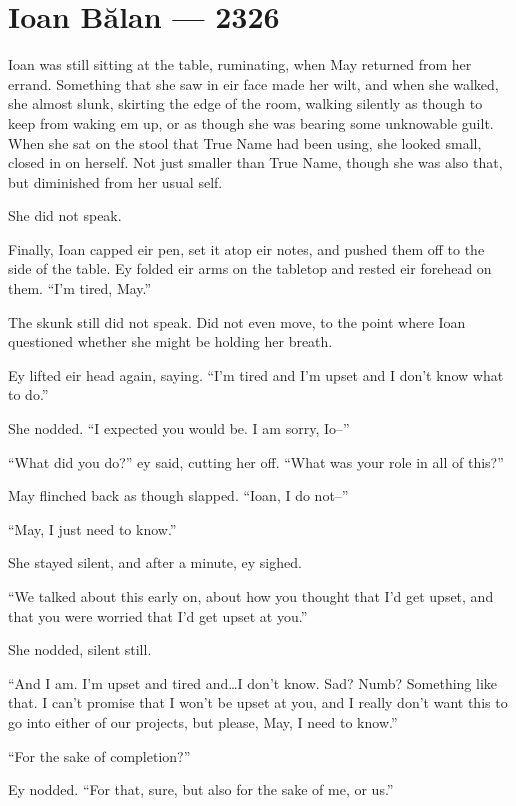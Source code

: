 \hypertarget{ioan-bux103lan-2326}{%
\chapter{Ioan Bălan — 2326}\label{ioan-bux103lan-2326}}

Ioan was still sitting at the table, ruminating, when May returned from her errand. Something that she saw in eir face made her wilt, and when she walked, she almost slunk, skirting the edge of the room, walking silently as though to keep from waking em up, or as though she was bearing some unknowable guilt. When she sat on the stool that True Name had been using, she looked small, closed in on herself. Not just smaller than True Name, though she was also that, but diminished from her usual self.

She did not speak.

Finally, Ioan capped eir pen, set it atop eir notes, and pushed them off to the side of the table. Ey folded eir arms on the tabletop and rested eir forehead on them. ``I'm tired, May.''

The skunk still did not speak. Did not even move, to the point where Ioan questioned whether she might be holding her breath.

Ey lifted eir head again, saying. ``I'm tired and I'm upset and I don't know what to do.''

She nodded. ``I expected you would be. I am sorry, Io--''

``What did you do?'' ey said, cutting her off. ``What was your role in all of this?''

May flinched back as though slapped. ``Ioan, I do not--''

``May, I just need to know.''

She stayed silent, and after a minute, ey sighed.

``We talked about this early on, about how you thought that I'd get upset, and that you were worried that I'd get upset at you.''

She nodded, silent still.

``And I am. I'm upset and tired and\ldots I don't know. Sad? Numb? Something like that. I can't promise that I won't be upset at you, and I really don't want this to go into either of our projects, but please, May, I need to know.''

``For the sake of completion?''

Ey nodded. ``For that, sure, but also for the sake of me, or us.''

